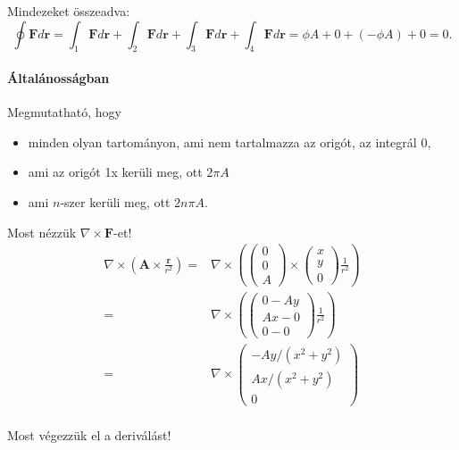 \documentclass[12pt,a4paper]{scrartcl}
\let\mathbf\bm
\begin{document}
Mindezeket összeadva: \[\oint {{\mathbf{F}}d{\mathbf{r}}}  = \int_1 {{\mathbf{F}}d{\mathbf{r}}}  + \int_2 {{\mathbf{F}}d{\mathbf{r}}}  + \int_3 {{\mathbf{F}}d{\mathbf{r}}}  + \int_4 {{\mathbf{F}}d{\mathbf{r}}}  = \phi {A } + 0 + \left( { - \phi {A }} \right) + 0 = 0.\]

\paragraph{Általánosságban} Megmutatható, hogy
\begin{itemize}
\item minden olyan tartományon, ami nem tartalmazza az origót, az integrál 0,
\item ami az origót 1x kerüli meg, ott $2\pi {A }$
\item ami $n$-szer kerüli meg, ott $2n\pi {A }$.
\end{itemize}

Most nézzük $\nabla  \times {\mathbf{F}}$-et! 
\[\begin{aligned}
  \nabla  \times \left( {{\mathbf{A}} \times \frac{{\mathbf{r}}}{{{r^2}}}} \right) =  & \nabla  \times \left( {\left( {\begin{array}{*{20}{c}}
  0 \\ 
  0 \\ 
  A 
\end{array}} \right) \times \left( {\begin{array}{*{20}{c}}
  x \\ 
  y \\ 
  0 
\end{array}} \right)\frac{1}{{{r^2}}}} \right) \\ 
   =  & \nabla  \times \left( {\left( {\begin{array}{*{20}{c}}
  {0 - Ay} \\ 
  {Ax - 0} \\ 
  {0 - 0} 
\end{array}} \right)\frac{1}{{{r^2}}}} \right) \\ 
   =  & \nabla  \times \left( {\begin{array}{*{20}{c}}
  { - Ay/\left( {{x^2} + {y^2}} \right)} \\ 
  {Ax/\left( {{x^2} + {y^2}} \right)} \\ 
  0 
\end{array}} \right) \\ 
\end{aligned} \]

Most végezzük el a deriválást!
\end{document}
